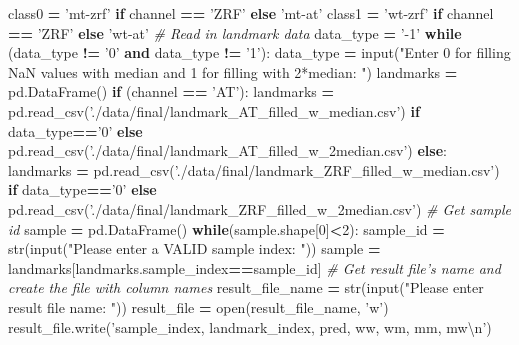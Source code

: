 \documentclass[10pt,letterpaper]{article}
\newenvironment{Shaded}{\begin{snugshade}}{\end{snugshade}}
\newcommand{\DecValTok}[1]{\textcolor[rgb]{0.00,0.00,0.81}{{#1}}}
\newcommand{\CharTok}[1]{\textcolor[rgb]{0.31,0.60,0.02}{{#1}}}
\newcommand{\StringTok}[1]{\textcolor[rgb]{0.31,0.60,0.02}{{#1}}}
\newcommand{\CommentTok}[1]{\textcolor[rgb]{0.56,0.35,0.01}{\textit{{#1}}}}
\newcommand{\ControlFlowTok}[1]{\textcolor[rgb]{0.13,0.29,0.53}{\textbf{{#1}}}}
\newcommand{\OperatorTok}[1]{\textcolor[rgb]{0.81,0.36,0.00}{\textbf{{#1}}}}
\newcommand{\BuiltInTok}[1]{{#1}}
\newcommand{\NormalTok}[1]{{#1}}
\begin{document}
\begin{Shaded}
\begin{Highlighting}[]
    \NormalTok{class0 }\OperatorTok{=} \StringTok{'mt-zrf'} \ControlFlowTok{if} \NormalTok{channel }\OperatorTok{==} \StringTok{'ZRF'} \ControlFlowTok{else} \StringTok{'mt-at'}
    \NormalTok{class1 }\OperatorTok{=} \StringTok{'wt-zrf'} \ControlFlowTok{if} \NormalTok{channel }\OperatorTok{==} \StringTok{'ZRF'} \ControlFlowTok{else} \StringTok{'wt-at'}
    \CommentTok{# Read in landmark data}
    \NormalTok{data_type }\OperatorTok{=} \StringTok{'-1'}
    \ControlFlowTok{while} \NormalTok{(data_type }\OperatorTok{!=} \StringTok{'0'} \OperatorTok{and} \NormalTok{data_type }\OperatorTok{!=} \StringTok{'1'}\NormalTok{):}
        \NormalTok{data_type }\OperatorTok{=} \BuiltInTok{input}\NormalTok{(}\StringTok{"Enter 0 for filling NaN values with median and 1 for filling with 2*median: "}\NormalTok{)}
    \NormalTok{landmarks }\OperatorTok{=} \NormalTok{pd.DataFrame()}
    \ControlFlowTok{if} \NormalTok{(channel }\OperatorTok{==} \StringTok{'AT'}\NormalTok{):}
        \NormalTok{landmarks }\OperatorTok{=} \NormalTok{pd.read_csv(}\StringTok{'./data/final/landmark_AT_filled_w_median.csv'}\NormalTok{) }\ControlFlowTok{if} \NormalTok{data_type}\OperatorTok{==}\StringTok{'0'} \ControlFlowTok{else} \NormalTok{pd.read_csv(}\StringTok{'./data/final/landmark_AT_filled_w_2median.csv'}\NormalTok{)}
    \ControlFlowTok{else}\NormalTok{:}
        \NormalTok{landmarks }\OperatorTok{=} \NormalTok{pd.read_csv(}\StringTok{'./data/final/landmark_ZRF_filled_w_median.csv'}\NormalTok{) }\ControlFlowTok{if} \NormalTok{data_type}\OperatorTok{==}\StringTok{'0'} \ControlFlowTok{else} \NormalTok{pd.read_csv(}\StringTok{'./data/final/landmark_ZRF_filled_w_2median.csv'}\NormalTok{)}
    \CommentTok{# Get sample id}
    \NormalTok{sample }\OperatorTok{=} \NormalTok{pd.DataFrame()}
    \ControlFlowTok{while}\NormalTok{(sample.shape[}\DecValTok{0}\NormalTok{]}\OperatorTok{<}\DecValTok{2}\NormalTok{):}
        \NormalTok{sample_id }\OperatorTok{=} \BuiltInTok{str}\NormalTok{(}\BuiltInTok{input}\NormalTok{(}\StringTok{"Please enter a VALID sample index: "}\NormalTok{))}
        \NormalTok{sample }\OperatorTok{=} \NormalTok{landmarks[landmarks.sample_index}\OperatorTok{==}\NormalTok{sample_id]}
    \CommentTok{# Get result file's name and create the file with column names}
    \NormalTok{result_file_name }\OperatorTok{=} \BuiltInTok{str}\NormalTok{(}\BuiltInTok{input}\NormalTok{(}\StringTok{"Please enter result file name: "}\NormalTok{))}
    \NormalTok{result_file }\OperatorTok{=} \BuiltInTok{open}\NormalTok{(result_file_name, }\StringTok{'w'}\NormalTok{)}
    \NormalTok{result_file.write(}\StringTok{'sample_index, landmark_index, pred, ww, wm, mm, mw}\CharTok{\textbackslash{}n}\StringTok{'}\NormalTok{)}

\end{Highlighting}
\end{Shaded}
\end{document}
